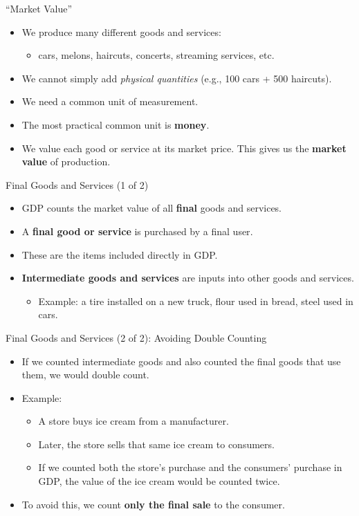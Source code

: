 \documentclass[aspectratio=169]{beamer}
\begin{document}
\begin{frame}{``Market Value''}
\transfade
\begin{itemize}[<+->]
  \item We produce many different goods and services:
  \begin{itemize}[<+->]
    \item cars, melons, haircuts, concerts, streaming services, etc.
  \end{itemize}
  \item We cannot simply add \emph{physical quantities} (e.g., 100 cars + 500 haircuts).
  \item We need a \alert{common unit of measurement}.
  \item The most practical common unit is \textbf{money}.
  \item We value each good or service at its \alert{market price}.  
  This gives us the \textbf{market value} of production.
\end{itemize}
\end{frame}

\begin{frame}{Final Goods and Services (1 of 2)}
\transfade
\begin{itemize}[<+->]
  \item GDP counts the market value of all \textbf{final} goods and services.
  \item A \textbf{final good or service} is purchased by a \alert{final user}.
  \item These are the items included directly in GDP.
  \item \textbf{Intermediate goods and services} are inputs into other goods and services.
  \begin{itemize}[<+->]
    \item Example: a tire installed on a new truck, flour used in bread, steel used in cars.
  \end{itemize}
\end{itemize}
\end{frame}

\begin{frame}{Final Goods and Services (2 of 2): Avoiding Double Counting}
\transfade
\begin{itemize}[<+->]
  \item If we counted intermediate goods and also counted the final goods that use them, we would \alert{double count}.
  \item Example:
  \begin{itemize}[<+->]
    \item A store buys ice cream from a manufacturer.
    \item Later, the store sells that same ice cream to consumers.
    \item If we counted both the store's purchase and the consumers' purchase in GDP, the value of the ice cream would be counted twice.
  \end{itemize}
  \item To avoid this, we count \textbf{only the final sale} to the consumer.
\end{itemize}
\end{frame}
\end{document}
